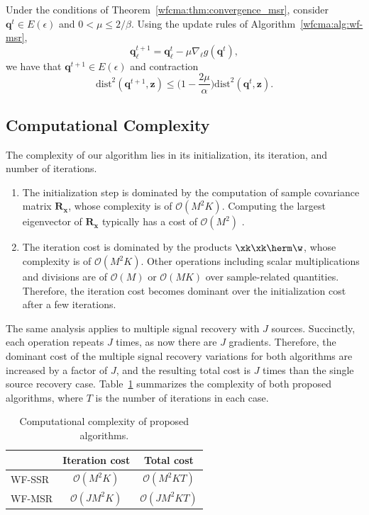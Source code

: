 \begin{lem} \label{wfcma:lemma:contraction_msr}
Under the conditions of Theorem~\ref{wfcma:thm:convergence_msr}, consider $\bm{q}^t\in E(\epsilon)$ and $0 < \mu \leq 2/\beta$. Using the update rules of Algorithm~\ref{wfcma:alg:wf-msr},
\begin{equation}
	\bm{q}_{\ell}^{t+1} = \bm{q}_{\ell}^t - \mu\nabla_{\ell} g(\bm{q}^t ),
\end{equation}
we have that $\bm{q}^{t+1}\in E(\epsilon)$ and contraction
\begin{equation}
	\mathrm{dist}^2	(\bm{q}^{t+1} ,\bm{z}) \leq \Big(1 -\frac{2\mu}{\alpha}\Big) \mathrm{dist}^2	(\bm{q}^t,\bm{z}). \label{wfcma:eqn:contraction_msr}
\end{equation}
\end{lem} 


\subsection{Computational Complexity}
The complexity of our algorithm lies in its initialization, its iteration, and number of iterations. 
\begin{enumerate}
\item The initialization step is dominated by the computation of sample covariance matrix $\bm{R}_{\bm{x}}$, whose complexity is of
$\mathcal{O}(M^2 K)$. Computing the largest eigenvector of $\bm{R}_{\bm{x}}$ typically has a cost of $\mathcal{O}(M^2)$ \cite{Candes2015a_phaseretrievalWF}.
\item The iteration cost is dominated by the products $\xk\xk\herm\w$, whose complexity is of $\mathcal{O}(M^2 K)$. 
Other operations including scalar multiplications and divisions are of
$\mathcal{O}(M)$ or $\mathcal{O}(MK)$ over 
sample-related quantities. Therefore, the iteration cost becomes dominant
over the initialization cost after a few iterations.
\end{enumerate}

The same analysis applies to multiple signal recovery with $J$ sources. 
Succinctly, each operation repeats $J$ times, as now there are $J$ gradients. 
Therefore, the dominant cost of the multiple signal recovery variations for both algorithms 
are increased by a factor of $J$, and the resulting total cost is $J$ times than the single source recovery case. 
Table~\ref{wfcma:table:complexity} summarizes the complexity of both proposed algorithms, where $T$ is the number of iterations in each case.
\begin{table}[htb]
\caption{Computational complexity of proposed algorithms.}\label{wfcma:table:complexity}
\centering
\begin{tabular}{l|cc}
	& Iteration cost & Total cost\\\hline
	WF-SSR&  $\mathcal{O}(M^2 K)$  & $\mathcal{O}(M^2 K T)$  \\
	WF-MSR&  $\mathcal{O}(JM^2K)$  & $\mathcal{O}(JM^2KT)$  \\
\end{tabular}
\end{table}

